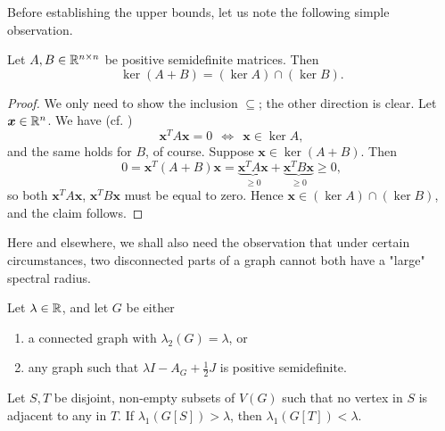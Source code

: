 Before establishing the upper bounds, let us note the following simple observation.
\begin{observation} \label{observation:positive-semidefinite-sum-kernel}
    Let $A, B \in \mathbb{R}^{n \times n}$ be positive semidefinite matrices. 
    Then 
    \begin{equation*}
        \ker (A + B) = (\ker A) \cap (\ker B).
    \end{equation*}
\end{observation}

\begin{proof}
    We only need to show the inclusion $\subseteq$; the other direction is clear.
    Let $\bm{x} \in \mathbb{R}^n$. We have (cf. \cite[Observation 7.1.6]{matrixanalysis})
    \begin{equation*}
        \bm{x}^T A \bm{x} = 0 \ \ \Longleftrightarrow \ \ \bm{x} \in \ker A,
    \end{equation*}
    and the same holds for $B$, of course.
    Suppose $\bm{x} \in \ker (A + B)$. 
    Then 
    \begin{equation*}
        0 = \bm{x}^T (A + B) \bm{x} = \underbrace{\bm{x}^T A \bm{x}}_{\ge 0} + \underbrace{\bm{x}^T B \bm{x}}_{\ge 0} \ge 0,
    \end{equation*}
    so both $\bm{x}^T A \bm{x}$, $\bm{x}^T B \bm{x}$ must be equal to zero.
    Hence $\bm{x} \in (\ker A) \cap (\ker B)$, and the claim follows.
\end{proof}

Here and elsewhere, we shall also need the observation that under certain circumstances, two disconnected parts of a graph cannot both have a "large" spectral radius.
\begin{lemma} \label{lem:disjoint-subgraphs}
    Let $\lambda \in \mathbb{R}$, and let $G$ be either
    \begin{enumerate}
        \item a connected graph with $\lambda_2(G) = \lambda$, or 
        \item any graph such that $\lambda I - A_G + \frac{1}{2} J$ is positive semidefinite.
    \end{enumerate}
    Let $S, T$ be disjoint, non-empty subsets of $V(G)$ such that no vertex in $S$ is adjacent to any in $T$.
    If $\lambda_1(G[S]) > \lambda$, then $\lambda_1(G[T]) < \lambda$.
\end{lemma}

